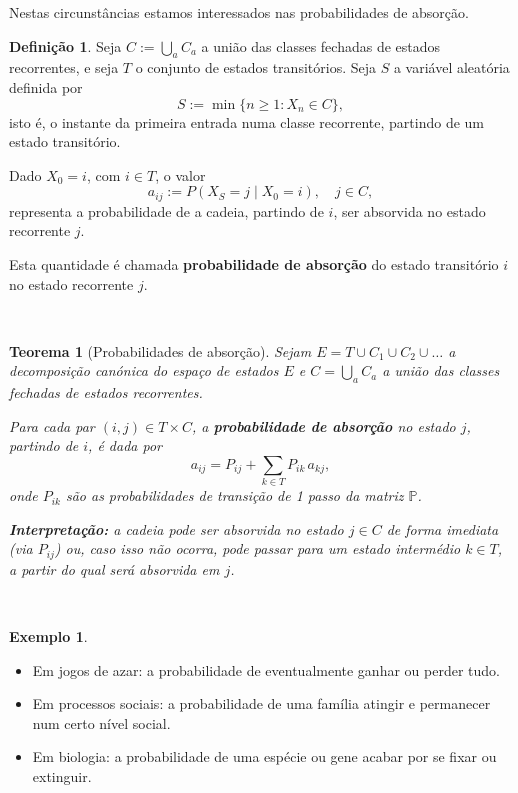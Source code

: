 \documentclass[
  11pt,
  a4paper,
]{book}
\newtheorem{theorem}{Teorema}[chapter]
\theoremstyle{definition}
\newtheorem{definition}{Definição}[chapter]
\theoremstyle{definition}
\newtheorem{example}{Exemplo}[chapter]
\theoremstyle{definition}
\theoremstyle{definition}
\theoremstyle{remark}
\begin{document}
Nestas circunstâncias estamos interessados nas probabilidades de absorção.

\begin{definition}
Seja \(C := \bigcup\limits_a C_a\) a união das classes fechadas de estados recorrentes, e seja \(T\) o conjunto de estados transitórios. Seja \(S\) a variável aleatória definida por
\[
S := \min\{n \geq 1 : X_n \in C\},
\]
isto é, o instante da primeira entrada numa classe recorrente, partindo de um estado transitório.

Dado \(X_0 = i\), com \(i \in T\), o valor
\[
a_{ij} := P(X_S = j \mid X_0 = i), \quad j \in C,
\]
representa a probabilidade de a cadeia, partindo de \(i\), ser absorvida no estado recorrente \(j\).

Esta quantidade é chamada \textbf{probabilidade de absorção} do estado transitório \(i\) no estado recorrente \(j\).
\end{definition}

\(\,\)

\begin{theorem}[Probabilidades de absorção]
Sejam \(E=T \cup C_1 \cup C_2 \cup \dots\) a decomposição canónica do espaço de estados \(E\) e \(C = \bigcup\limits_a C_a\) a união das classes fechadas de estados recorrentes.

Para cada par \((i,j) \in T \times C\), a \textbf{probabilidade de absorção} no estado \(j\), partindo de \(i\), é dada por
\[
a_{ij} = P_{ij} + \sum_{k \in T} P_{ik} \, a_{kj},
\]
onde \(P_{ik}\) são as probabilidades de transição de 1 passo da matriz \(\mathbb{P}\).

\textbf{Interpretação:} a cadeia pode ser absorvida no estado \(j \in C\) de forma imediata (via \(P_{ij}\)) ou, caso isso não ocorra, pode passar para um estado intermédio \(k \in T\), a partir do qual será absorvida em \(j\).
\end{theorem}

\(\,\)

\begin{example}
\leavevmode

\begin{itemize}
\item
  Em jogos de azar: a probabilidade de eventualmente ganhar ou perder tudo.
\item
  Em processos sociais: a probabilidade de uma família atingir e permanecer num certo nível social.
\item
  Em biologia: a probabilidade de uma espécie ou gene acabar por se fixar ou extinguir.
\end{itemize}

\end{example}
\end{document}
